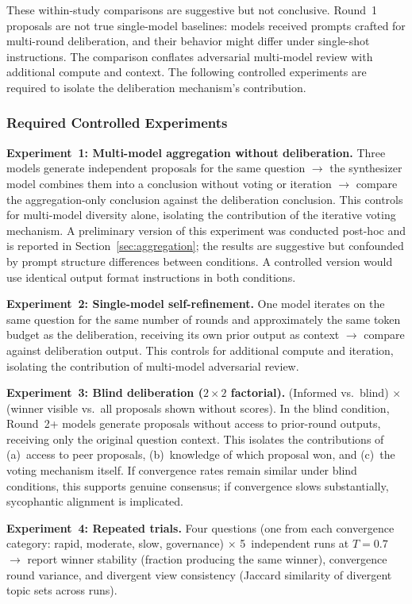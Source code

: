 \documentclass[11pt,a4paper]{article}
\begin{document}
These within-study comparisons are suggestive but not conclusive. Round~1 proposals are not true single-model baselines: models received prompts crafted for multi-round deliberation, and their behavior might differ under single-shot instructions. The comparison conflates adversarial multi-model review with additional compute and context. The following controlled experiments are required to isolate the deliberation mechanism's contribution.

\subsubsection{Required Controlled Experiments}

\textbf{Experiment~1: Multi-model aggregation without deliberation.} Three models generate independent proposals for the same question $\rightarrow$ the synthesizer model combines them into a conclusion without voting or iteration $\rightarrow$ compare the aggregation-only conclusion against the deliberation conclusion. This controls for multi-model diversity alone, isolating the contribution of the iterative voting mechanism. A preliminary version of this experiment was conducted post-hoc and is reported in Section~\ref{sec:aggregation}; the results are suggestive but confounded by prompt structure differences between conditions. A controlled version would use identical output format instructions in both conditions.

\textbf{Experiment~2: Single-model self-refinement.} One model iterates on the same question for the same number of rounds and approximately the same token budget as the deliberation, receiving its own prior output as context $\rightarrow$ compare against deliberation output. This controls for additional compute and iteration, isolating the contribution of multi-model adversarial review.

\textbf{Experiment~3: Blind deliberation ($2\times2$ factorial).} (Informed vs.\ blind) $\times$ (winner visible vs.\ all proposals shown without scores). In the blind condition, Round~2+ models generate proposals without access to prior-round outputs, receiving only the original question context. This isolates the contributions of (a)~access to peer proposals, (b)~knowledge of which proposal won, and (c)~the voting mechanism itself. If convergence rates remain similar under blind conditions, this supports genuine consensus; if convergence slows substantially, sycophantic alignment is implicated.

\textbf{Experiment~4: Repeated trials.} Four questions (one from each convergence category: rapid, moderate, slow, governance) $\times$ 5~independent runs at $T=0.7$ $\rightarrow$ report winner stability (fraction producing the same winner), convergence round variance, and divergent view consistency (Jaccard similarity of divergent topic sets across runs).
\end{document}
